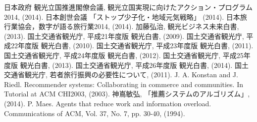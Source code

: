 
\begin{thebibliography}{report}

 日本政府 観光立国推進閣僚会議, 観光立国実現に向けたアクション・プログラム2014, (2014).
 日本創世会議 「ストップ少子化・地域元気戦略」 (2014).
 日本旅行業協会，数字が語る旅行業2014, (2014).
 加藤弘治, 観光ビジネス未来白書, (2013).
 国土交通省観光庁, 平成21年度版 観光白書, (2009).
 国土交通省観光庁, 平成22年度版 観光白書, (2010).
 国土交通省観光庁, 平成23年度版 観光白書, (2011).
 国土交通省観光庁, 平成24年度版 観光白書, (2012).
 国土交通省観光庁, 平成25年度版 観光白書, (2013).
 国土交通省観光庁, 平成26年度版 観光白書, (2014).
 国土交通省観光庁, 若者旅行振興の必要性について, (2011).
 J. A. Konstan and J. Riedl. Recommender systems: Collaborating in commerce and communities. In Tutorial at ACM CHI2003, (2003).
 神嶌敏弘, 「推薦システムのアルゴリズム」, (2014).
 P. Maes. Agents that reduce work and information overload. Communications of ACM, Vol. 37, No. 7, pp. 30-40, (1994).


\end{thebibliography}
